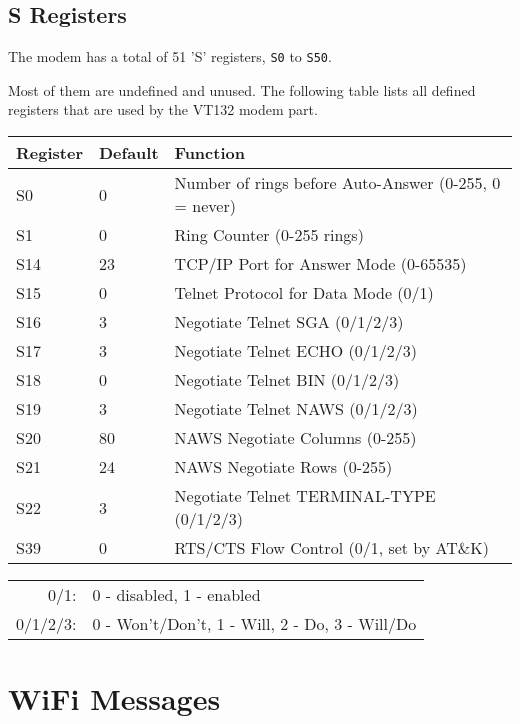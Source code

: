 \subsection{S Registers}
\label{sregister}

The modem has a total of 51 'S' registers, \texttt{S0} to \texttt{S50}.

Most of them are undefined and unused. The following table lists all defined registers that are used by the VT132 modem part.

\begin{tabulary}{\textwidth}{L | L | L}
\hline
\mbox{\textbf{Register}} & \mbox{\textbf{Default}} & \textbf{Function} \\
\hline
S0	& 0		& Number of rings before Auto-Answer \newline (0-255, 0 = never) \\
S1	& 0		& Ring Counter (0-255 rings) \\
S14	& 23	& TCP/IP Port for Answer Mode (0-65535) \\
S15	& 0		& Telnet Protocol for Data Mode (0/1) \\
S16	& 3		& Negotiate Telnet SGA (0/1/2/3) \\
S17	& 3		& Negotiate Telnet ECHO (0/1/2/3) \\
S18	& 0		& Negotiate Telnet BIN (0/1/2/3) \\
S19	& 3		& Negotiate Telnet NAWS (0/1/2/3) \\
S20	& 80	& NAWS Negotiate Columns (0-255) \\
S21	& 24	& NAWS Negotiate Rows (0-255) \\
S22	& 3		& Negotiate Telnet TERMINAL-TYPE (0/1/2/3) \\
S39	& 0		& RTS/CTS Flow Control (0/1, set by AT\&K) \\
\hline
\end{tabulary}

\bigskip
\begin{tabular}{rl}
0/1:		& 0 - disabled, 1 - enabled \\
0/1/2/3:	& 0 - Won't/Don't, 1 - Will, 2 - Do, 3 - Will/Do \\
\end{tabular}


\newpage
\section{WiFi Messages}


